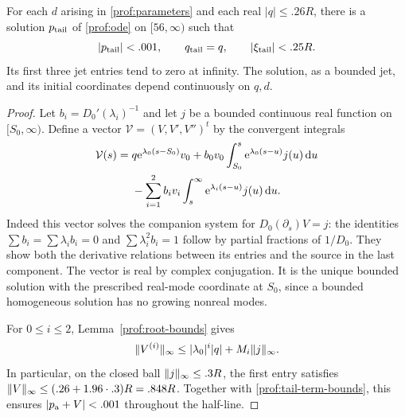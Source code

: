 \begin{lemma}\label{prof:tail}
For each $d$ arising in \eqref{prof:parameters} and each real
$|q|\le .26R$, there is a solution $p_{\rm tail}$ of \eqref{prof:ode}
on $[56,\infty)$ such that
\[
 |p_{\rm tail}|<.001,
 \qquad q_{\rm tail}=q,\qquad |\xi_{\rm tail}|<.25R.
\]
Its first three jet entries tend to zero at infinity.  The solution,
as a bounded jet, and its initial coordinates depend continuously on $q,d$.
\end{lemma}

\begin{proof}
Let $b_i=D_0'(\lambda_i)^{-1}$ and let $j$ be a bounded continuous
real function on $[S_0,\infty)$.  Define a vector $\mathcal V=(V,V',V'')^t$
by the convergent integrals
\begin{equation}\label{prof:green-formula}
 \begin{split}
 \mathcal V(s)={}&q\mathrm{e}^{\lambda_0(s-S_0)}v_0
  +b_0v_0\int_{S_0}^s\mathrm{e}^{\lambda_0(s-u)}j(u)\,\mathrm{d} u\\
 &-\sum_{i=1}^2 b_iv_i\int_s^\infty\mathrm{e}^{\lambda_i(s-u)}j(u)\,\mathrm{d} u.
 \end{split}
\end{equation}
Indeed this vector solves the companion system for
$D_0(\partial_s)V=j$: the identities
$\sum b_i=\sum\lambda_ib_i=0$ and $\sum\lambda_i^2b_i=1$ follow
by partial fractions of $1/D_0$.  They show both the derivative relations
between its entries and the source in the last component.  The vector is
real by complex conjugation.  It is the unique bounded solution with the
prescribed real-mode coordinate at $S_0$, since a bounded homogeneous
solution has no growing nonreal modes.

For $0\le i\le2$, Lemma~\ref{prof:root-bounds} gives
\begin{equation}\label{prof:green-bound}
 \lVert V^{(i)}\rVert_\infty\le |\lambda_0|^i|q|+M_i\lVert j\rVert_\infty.
\end{equation}
In particular, on the closed ball $\lVert j\rVert_\infty\le .3R$, the first
entry satisfies
$\lVert V\rVert_\infty\le(.26+1.96\cdot.3)R=.848R$.
Together with \eqref{prof:tail-term-bounds}, this ensures
$|p_{\rm a}+V|<.001$ throughout the half-line.


\end{proof}
